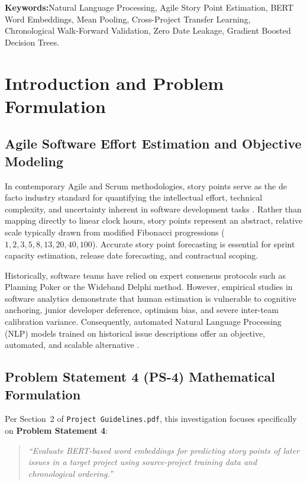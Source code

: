 \documentclass[11pt,a4paper]{article}
\begin{document}
\textbf{\color{primarynavy}Keywords:}\quad Natural Language Processing, Agile Story Point Estimation, BERT Word Embeddings, Mean Pooling, Cross-Project Transfer Learning, Chronological Walk-Forward Validation, Zero Date Leakage, Gradient Boosted Decision Trees.

\vspace{0.8em}

\section{Introduction and Problem Formulation}
\label{sec:intro}

\subsection{Agile Software Effort Estimation and Objective Modeling}
In contemporary Agile and Scrum methodologies, story points serve as the de facto industry standard for quantifying the intellectual effort, technical complexity, and uncertainty inherent in software development tasks \cite{cohn2005agile}. Rather than mapping directly to linear clock hours, story points represent an abstract, relative scale typically drawn from modified Fibonacci progressions ($1, 2, 3, 5, 8, 13, 20, 40, 100$). Accurate story point forecasting is essential for sprint capacity estimation, release date forecasting, and contractual scoping.

Historically, software teams have relied on expert consensus protocols such as Planning Poker or the Wideband Delphi method. However, empirical studies in software analytics demonstrate that human estimation is vulnerable to cognitive anchoring, junior developer deference, optimism bias, and severe inter-team calibration variance. Consequently, automated Natural Language Processing (NLP) models trained on historical issue descriptions offer an objective, automated, and scalable alternative \cite{choetkiertikul2018deep}.

\subsection{Problem Statement 4 (PS-4) Mathematical Formulation}
Per Section~2 of \texttt{Project Guidelines.pdf}, this investigation focuses specifically on \textbf{Problem Statement 4}:
\begin{quote}
\textit{``Evaluate BERT-based word embeddings for predicting story points of later issues in a target project using source-project training data and chronological ordering.''}
\end{quote}
\end{document}
